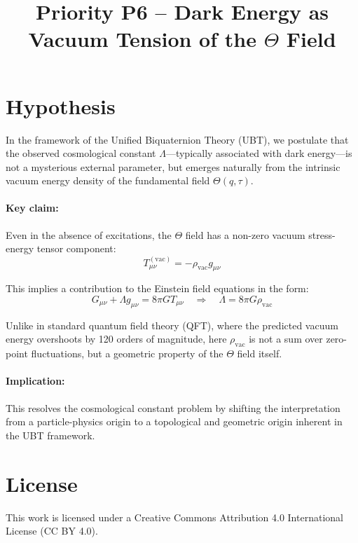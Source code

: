 \documentclass[12pt]{article}
\title{Priority P6 – Dark Energy as Vacuum Tension of the $\Theta$ Field}
\author{}
\date{}
\begin{document}
\maketitle


\SpeculativeContentWarning

\section*{Hypothesis}

In the framework of the Unified Biquaternion Theory (UBT), we postulate that the observed cosmological constant $\Lambda$---typically associated with dark energy---is not a mysterious external parameter, but emerges naturally from the intrinsic vacuum energy density of the fundamental field $\Theta(q, \tau)$.

\paragraph{Key claim:} Even in the absence of excitations, the $\Theta$ field has a non-zero vacuum stress-energy tensor component:
\[
T_{\mu\nu}^{(\text{vac})} = -\rho_{\text{vac}} g_{\mu\nu}
\]

This implies a contribution to the Einstein field equations in the form:
\[
G_{\mu\nu} + \Lambda g_{\mu\nu} = 8\pi G T_{\mu\nu} \quad \Rightarrow \quad \Lambda = 8\pi G \rho_{\text{vac}}
\]

Unlike in standard quantum field theory (QFT), where the predicted vacuum energy overshoots by 120 orders of magnitude, here $\rho_{\text{vac}}$ is not a sum over zero-point fluctuations, but a geometric property of the $\Theta$ field itself.

\paragraph{Implication:} This resolves the cosmological constant problem by shifting the interpretation from a particle-physics origin to a topological and geometric origin inherent in the UBT framework.


\section*{License}
This work is licensed under a Creative Commons Attribution 4.0 International License (CC BY 4.0).
\end{document}
